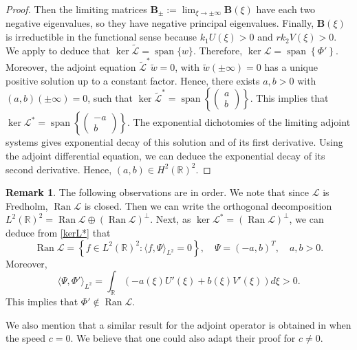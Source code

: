 \documentclass[11pt]{article}
\numberwithin{equation}{section}
\newcommand{\1}{\mathbbm{1}}
\numberwithin{equation}{section}
\theoremstyle{definition}
\newtheorem{remark}[theorem]{Remark}
\def \dis {\displaystyle}
\def \R {\mathbb{R}}
\def \B {\mathbf{B}}
\def \L {\mathcal{L}}
\numberwithin{equation}{section}
\def \dis {\displaystyle}
\begin{document}
\begin{proof}
Then the limiting matrices $\dis \B_{\pm}:=\lim_{\xi\to \pm\infty}\B(\xi)$ have each two negative eigenvalues, so they have negative principal eigenvalues.  Finally, $\B(\xi)$ is irreductible in the functional sense because $k_1U(\xi)>0$ and $rk_2V(\xi)>0$. We apply \cite[Chapter 4, Theorem 5.1]{volpert1994} to deduce that $\operatorname{ker} \tilde{\L}=\operatorname{span}\{w\}$. Therefore, $\operatorname{ker}\L=\operatorname{span}\left\{\Phi'\right\}.$ Moreover, the adjoint equation $\tilde{\L}^*\tilde{w}=0$, with $\tilde{w}(\pm \infty)=0$ has a unique positive solution up to a constant factor. Hence, there exists $a,b>0$ with  $(a,b)(\pm \infty)=0$,  such that $\operatorname{ker}\tilde{\L}^*=\operatorname{span}\left\{ \begin{pmatrix} a\\b\end{pmatrix} \right\}$.  This implies that $\operatorname{ker}\L^*=\operatorname{span}\left\{ \begin{pmatrix} -a\\b\end{pmatrix} \right\}$. The exponential dichotomies of the limiting adjoint systems gives exponential decay of this solution and of its first derivative. Using the adjoint differential equation, we can deduce the exponential decay of its second derivative. Hence, $(a,b)\in H^2(\R)^2$. 
\end{proof}


\begin{remark}\label{remark1} The following observations are in order.
We note that since $\L$ is Fredholm, $\operatorname{Ran} \L$ is closed. Then we can write the orthogonal decomposition $L^2(\mathbb{R})^2=\operatorname{Ran} \L \oplus(\operatorname{Ran}\L)^{\perp}$. Next, as $\operatorname{ker} \L^*=(\operatorname{Ran} \L)^{\perp}$, we can deduce from  \eqref{kerL*} that 
\begin{equation}\label{ranL}
\operatorname{Ran}\L =\left\{f\in L^2(\R)^2: \langle f,\Psi\rangle_{L^2}=0\right\}, \quad \Psi=(-a,b)^T, \quad a,b>0.
\end{equation}
Moreover, 
\begin{equation}\label{imp0}
\langle \Psi, \Phi'\rangle_{L^2}=\int_{\R}(-a(\xi)U'(\xi)+b(\xi)V'(\xi))d\xi>0. 
\end{equation}
This implies that $\Phi'\notin \operatorname{Ran}\L$.  

We also mention that a similar result for the adjoint operator is obtained in \cite[Lemma A. 2.]{kan1993} when the speed $c=0$. We believe that one could also adapt their proof for $c\neq0$. 
\end{remark}
\end{document}
